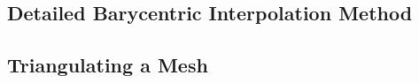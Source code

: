\documentclass[final,twocolumn,12pt]{elsarticle}
\begin{document}
\begin{appendices}


\section{Detailed Barycentric Interpolation Method}
\label{sec:app}
\renewcommand\thefigure{\thesection.\arabic{figure}} 
\setcounter{figure}{0}
\subsection{Triangulating a  Mesh}
\label{app:bary-tri}




\end{appendices}
\end{document}
